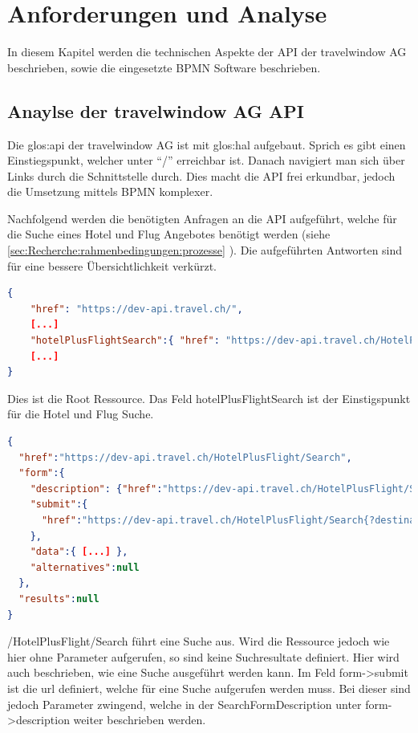 

\chapter{Anforderungen und Analyse}
\label{sec:analyse}
In diesem Kapitel werden die technischen Aspekte der API der travelwindow AG beschrieben, sowie die eingesetzte BPMN Software beschrieben.

\section{Anaylse der travelwindow AG API}
\label{sec:analyse:api}
Die \Gls{glos:api} der travelwindow AG ist mit \Gls{glos:hal} aufgebaut. Sprich es gibt einen Einstiegspunkt, welcher unter "`/"' erreichbar ist. Danach navigiert man sich über Links durch die Schnittstelle durch. Dies macht die API frei erkundbar, jedoch die Umsetzung mittels BPMN komplexer.

Nachfolgend werden die benötigten Anfragen an die API aufgeführt, welche für die Suche eines Hotel und Flug Angebotes benötigt werden (siehe \cref{sec:Recherche:rahmenbedingungen:prozesse} ). Die aufgeführten Antworten sind für eine bessere Übersichtlichkeit verkürzt.


\begin{lstlisting}[language=json,firstnumber=1]
{
	"href": "https://dev-api.travel.ch/",
	[...]
	"hotelPlusFlightSearch":{ "href": "https://dev-api.travel.ch/HotelPlusFlight/Search" },
	[...]
}
\end{lstlisting}
Dies ist die Root Ressource. Das Feld hotelPlusFlightSearch ist der Einstigspunkt für die Hotel und Flug Suche.

\begin{lstlisting}[language=json,firstnumber=1]
{
  "href":"https://dev-api.travel.ch/HotelPlusFlight/Search",
  "form":{
    "description": {"href":"https://dev-api.travel.ch/HotelPlusFlight/SearchFormDescription/HotelPlusFlight"},
    "submit":{
      "href":"https://dev-api.travel.ch/HotelPlusFlight/Search{?destination,periodOfStay,roomOccupancies*,departureAirport,departureAirports*,targetPeriodOfStay,hotelCategories*,ratings,mealTypeCategories*,directFlight,flightClasses*,matchHotels,productType}"
    },
    "data":{ [...] },
    "alternatives":null
  },
  "results":null
}
\end{lstlisting}
/HotelPlusFlight/Search führt eine Suche aus. Wird die Ressource jedoch wie hier ohne Parameter aufgerufen, so sind keine Suchresultate definiert.
Hier wird auch beschrieben, wie eine Suche ausgeführt werden kann. Im Feld form->submit ist die \gls{url} definiert, welche für eine Suche aufgerufen werden muss. Bei dieser sind jedoch Parameter zwingend, welche in der SearchFormDescription unter form->description weiter beschrieben werden.

